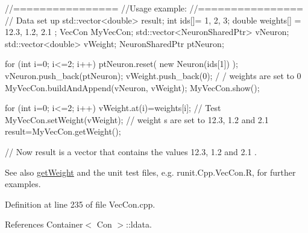 \begin{DoxyCode}
        //================
        //Usage example:
        //================
        // Data set up
                std::vector<double> result;
                        int ids[]= {1, 2, 3};
                        double weights[] = {12.3, 1.2, 2.1 };
                        VecCon MyVecCon;
                        std::vector<NeuronSharedPtr> vNeuron;
                        std::vector<double> vWeight;
                        NeuronSharedPtr ptNeuron;

                        for (int i=0; i<=2; i++) {
                        ptNeuron.reset( new Neuron(ids[1]) );
                        vNeuron.push_back(ptNeuron);
                        vWeight.push_back(0);                                   /
      / weights are set to 0
                        }
                        MyVecCon.buildAndAppend(vNeuron, vWeight);
                        MyVecCon.show();

                        for (int i=0; i<=2; i++) {
                                vWeight.at(i)=weights[i];
                        }
        // Test
                        MyVecCon.setWeight(vWeight);                    // weight
      s are set to 12.3, 1.2 and 2.1
                        result=MyVecCon.getWeight();

        // Now result is a vector that contains the values 12.3, 1.2 and 2.1 .
\end{DoxyCode}


\begin{DoxySeeAlso}{See also}
\hyperlink{classvec_con_a76f10669494f2247d036ae6a1f296873}{getWeight} and the unit test files, e.g. runit.Cpp.VecCon.R, for further examples. 
\end{DoxySeeAlso}


Definition at line 235 of file VecCon.cpp.



References Container$<$ Con $>$::ldata.


